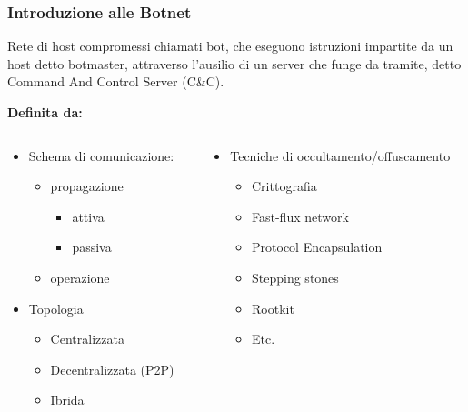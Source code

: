 \begin{frame}
    \titlepage
\end{frame}



\begin{frame}
    \frametitle{Introduzione  alle Botnet}
    \begin{definition}[Botnet]
        Rete di host compromessi chiamati bot, che eseguono istruzioni impartite da un host detto botmaster, attraverso l'ausilio di un server che funge da tramite,  detto Command And Control Server (C\&C).
    \end{definition}
    \centering
    \textbf{Definita da:}
    \begin{columns}[t]

        \begin{column}{0.5\textwidth}
            \begin{itemize}
                \item Schema di comunicazione:
                      \begin{itemize}
                          \item propagazione
                                \begin{itemize}
                                    \item attiva
                                    \item passiva
                                \end{itemize}
                          \item operazione
                      \end{itemize}
                \item Topologia
                      \begin{itemize}
                          \item Centralizzata
                          \item Decentralizzata (P2P)
                          \item Ibrida
                      \end{itemize}
            \end{itemize}
        \end{column}
        \begin{column}{0.5\textwidth}
            \begin{itemize}
                \item Tecniche di occultamento/offuscamento
                      \begin{itemize}
                          \item Crittografia
                          \item Fast-flux network
                          \item Protocol Encapsulation
                          \item Stepping stones
                          \item Rootkit
                          \item Etc.
                      \end{itemize}


\end{itemize}
\end{column}
\end{columns}
\end{frame}
